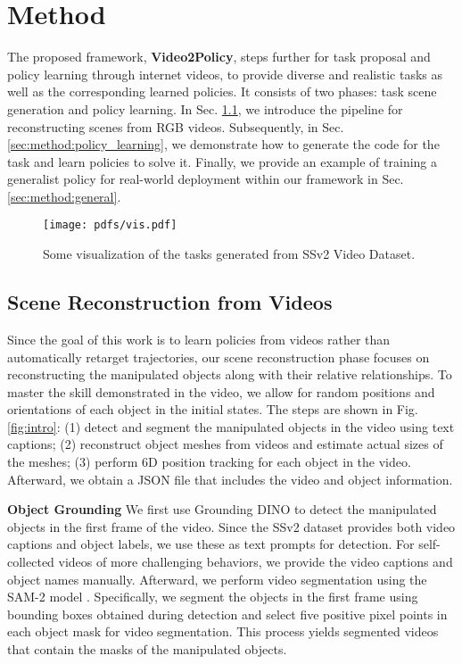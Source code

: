 \section{Method}
\label{sec:method}
The proposed framework, \textbf{Video2Policy}, steps further for task proposal and policy learning through internet videos, to provide diverse and realistic tasks as well as the corresponding learned policies. It consists of two phases: task scene generation and policy learning. In Sec. \ref{sec:method:scene_reconstruction}, we introduce the pipeline for reconstructing scenes from RGB videos. Subsequently, in Sec. \ref{sec:method:policy_learning}, we demonstrate how to generate the code for the task and learn policies to solve it. Finally, we provide an example of training a generalist policy for real-world deployment within our framework in Sec. \ref{sec:method:general}.

\begin{figure*}
    \centering
    \vskip -0.2cm
    \texttt{[image: pdfs/vis.pdf]}
    \vskip -0.2cm
    \caption{Some visualization of the tasks generated from SSv2 Video Dataset.}
    \label{fig:exp_vis}
    \vskip -0.5cm
\end{figure*}

\subsection{Scene Reconstruction from Videos}
\label{sec:method:scene_reconstruction}

Since the goal of this work is to learn policies from videos rather than automatically retarget trajectories, our scene reconstruction phase focuses on reconstructing the manipulated objects along with their relative relationships. To master the skill demonstrated in the video, we allow for random positions and orientations of each object in the initial states. 
The steps are shown in Fig. \ref{fig:intro}:
(1) detect and segment the manipulated objects in the video using text captions; (2) reconstruct object meshes from videos and estimate actual sizes of the meshes; (3) perform 6D position tracking for each object in the video. Afterward, we obtain a JSON file that includes the video and object information.

\textbf{Object Grounding} We first use Grounding DINO \citep{liu2023grounding} to detect the manipulated objects in the first frame of the video. Since the SSv2 dataset \citep{goyal2017something} provides both video captions and object labels, we use these as text prompts for detection. For self-collected videos of more challenging behaviors, we provide the video captions and object names manually. Afterward, we perform video segmentation using the SAM-2 model \citep{ravi2024sam}. Specifically, we segment the objects in the first frame using bounding boxes obtained during detection and select five positive pixel points in each object mask for video segmentation. This process yields segmented videos that contain the masks of the manipulated objects.

